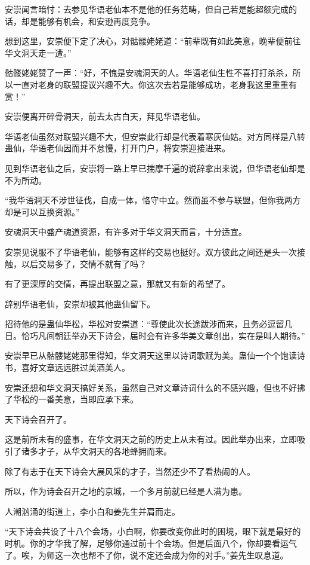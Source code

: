 \begin{this_body}
安崇闻言暗忖：去参见华语老仙本不是他的任务范畴，但自己若是能超额完成的话，却是能够有机会，和安逊再度竞争。

想到这里，安崇便下定了决心，对骷髅姥姥道：“前辈既有如此美意，晚辈便前往华文洞天走一遭。”

骷髅姥姥赞了一声：“好，不愧是安魂洞天的人。华语老仙生性不喜打打杀杀，所以一直对老身的联盟提议兴趣不大。你这次去若是能够成功，老身我这里重重有赏！”

安崇便离开碎骨洞天，前去太古白天，拜见华语老仙。

华语老仙虽然对联盟兴趣不大，但安崇此行却是代表着寒灰仙姑。对方同样是八转蛊仙，华语老仙因而并不怠慢，打开门户，将安崇迎接进来。

见到华语老仙之后，安崇将一路上早已揣摩千遍的说辞拿出来说，但华语老仙却是不为所动。

“我华语洞天不涉世征伐，自成一体，恪守中立。然而虽不参与联盟，但你我两方却是可以互换资源。”

安魂洞天中盛产魂道资源，有许多对于华文洞天而言，十分适宜。

安崇见说服不了华语老仙，能够有这样的交易也挺好。双方彼此之间还是头一次接触，以后交易多了，交情不就有了吗？

有了更深厚的交情，再提出联盟之意，那就又有新的希望了。

辞别华语老仙，安崇却被其他蛊仙留下。

招待他的是蛊仙华松，华松对安崇道：“尊使此次长途跋涉而来，且务必逗留几日。恰巧凡间朝廷举办天下诗会，届时会有许多华美文章创出，实在是叫人期待。”

安崇早已从骷髅姥姥那里得知，华文洞天这里以诗词歌赋为美。蛊仙一个个饱读诗书，喜好文章远远胜过美酒美人。

安崇还想和华文洞天搞好关系，虽然自己对文章诗词什么的不感兴趣，但也不好拂了华松的一番美意，当即应承下来。

天下诗会召开了。

这是前所未有的盛事，在华文洞天之前的历史上从未有过。因此举办出来，立即吸引了诸多才子，从华文洞天的各地蜂拥而来。

除了有志于在天下诗会大展风采的才子，当然还少不了看热闹的人。

所以，作为诗会召开之地的京城，一个多月前就已经是人满为患。

人潮汹涌的街道上，李小白和姜先生并肩而走。

“天下诗会共设了十八个会场，小白啊，你要改变你此时的困境，眼下就是最好的时机。你的才华我了解，足够你通过前十个会场。但是后面八个，你却要看运气了。唉，为师这一次也帮不了你，说不定还会成为你的对手。”姜先生叹息道。


\end{this_body}

